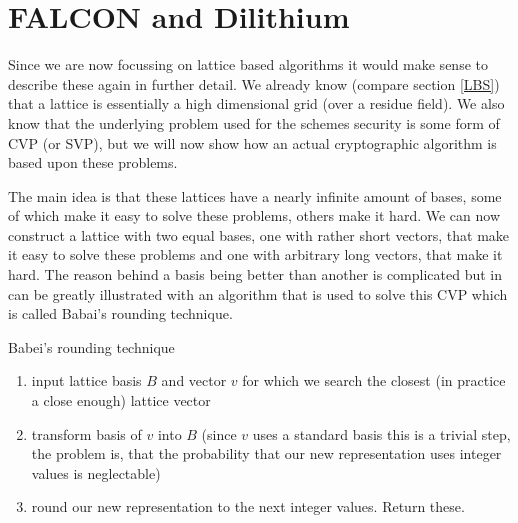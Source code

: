 \documentclass[conference]{IEEEtran}
\newcommand{\comment}[1]{}
\begin{document}
\section{FALCON and Dilithium}\label{falcon}
\comment{ %
falcon-512 (L1):
pubk/sig 897/690 bytes (dil3: 1472/2701 ecdsa: 64)
keygen: 182m clk , 118mJ (dil3: 2.3m / 1.7mJ ecdsa 5mJ)
sign/ver: 23.5/0.345 mJ (dil3 5mJ/1.7mJ ecdsa 4mJ)

falcon-1024 (L5):
pubk/sig 1793/1330 bytes
keygen: 380m clk , 232mJ
sign/ver: 45.5/0.69 mJ
\cite{Energy_comp}

FALCON was side channel attacked by measuring electromagnetic radiation on the FFT inside the sampler which uses the floating point unit, could reconstruct privk after 10k measurements \cite{falcon_side_channel}  therefor zalcon was introduced which ditches FPA (also good for other iot devices) and uses NTT instead of FTT \cite{zalcon} but this seems to be even worse \cite{falcon_side_channel}, still one could implement masking to randomize power consumption etc.

} %
Since we are now focussing on lattice based algorithms it would make sense to describe these again in further detail.
We already know (compare section \ref{LBS}) that a lattice is essentially a high dimensional grid (over a residue field). %
We also know that the underlying problem used for the schemes security is some form of CVP (or SVP), but we will now show how an actual cryptographic algorithm is based upon these problems.

The main idea is that these lattices have a nearly infinite amount of bases, some of which make it easy to solve these problems, others make it hard.
We can now construct a lattice with two equal bases, one with rather short vectors, that make it easy to solve these problems and one with arbitrary long vectors, that make it hard.
The reason behind a basis being better than another is complicated but in can be greatly illustrated with an algorithm that is used to solve this CVP which is called Babai's rounding technique.\cite{CVP_algorithms}

\begin{algorithm}
    \caption{Babei's rounding technique}\label{alg:babei}
        \begin{enumerate}
            \item input lattice basis $B$ and vector $v$ for which we search the closest (in practice a close enough) lattice vector
            \item transform basis of $v$ into $B$ (since $v$ uses a standard basis this is a trivial step, the problem is, that the probability that our new representation uses integer values is neglectable)
            \item round our new representation to the next integer values. Return these.
        \end{enumerate}
    \end{algorithm}
\end{document}
